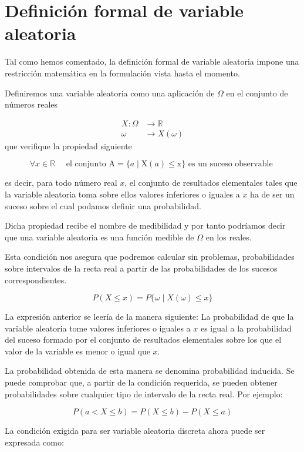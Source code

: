 \documentclass[
  a4paper,
  DIV=11,
  numbers=noendperiod]{scrreprt}
\begin{document}
\section{Definición formal de variable
aleatoria}\label{definiciuxf3n-formal-de-variable-aleatoria}

Tal como hemos comentado, la definición formal de variable aleatoria
impone una restricción matemática en la formulación vista hasta el
momento.

Definiremos una variable aleatoria como una aplicación de \(\Omega\) en
el conjunto de números reales

\[
\begin{aligned}
X: \Omega & \rightarrow \mathbb{R} \\
\omega & \rightarrow X(\omega)
\end{aligned}
\] que verifique la propiedad siguiente

\[
\forall x \in \mathbb{R} \quad \text { el conjunto } \mathrm{A}=\{a \mid \mathrm{X}(a) \leq \mathrm{x}\} \text { es un suceso observable }
\]

es decir, para todo número real \(x\), el conjunto de resultados
elementales tales que la variable aleatoria toma sobre ellos valores
inferiores o iguales a \(x\) ha de ser un suceso sobre el cual podamos
definir una probabilidad.

Dicha propiedad recibe el nombre de medibilidad y por tanto podríamos
decir que una variable aleatoria es una función medible de \(\Omega\) en
los reales.

Esta condición nos asegura que podremos calcular sin problemas,
probabilidades sobre intervalos de la recta real a partir de las
probabilidades de los sucesos correspondientes.

\[
P(X \leq x)=P\{\omega \mid X(\omega) \leq x\}
\]

La expresión anterior se leería de la manera siguiente: La probabilidad
de que la variable aleatoria tome valores inferiores o iguales a \(x\)
es igual a la probabilidad del suceso formado por el conjunto de
resultados elementales sobre los que el valor de la variable es menor o
igual que \(x\).

La probabilidad obtenida de esta manera se denomina probabilidad
inducida. Se puede comprobar que, a partir de la condición requerida, se
pueden obtener probabilidades sobre cualquier tipo de intervalo de la
recta real. Por ejemplo:

\[
P(a<X \leq b)=P(X \leq b)-P(X \leq a)
\]

La condición exigida para ser variable aleatoria discreta ahora puede
ser expresada como:
\end{document}
